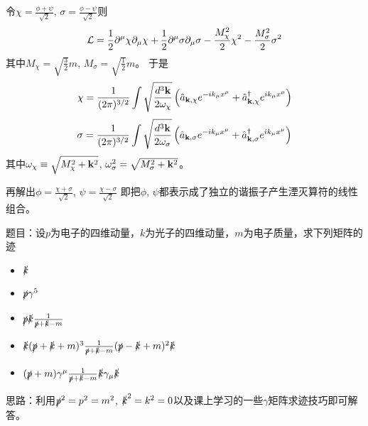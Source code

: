 \documentclass[CJK]{beamer}
\begin{document}
\begin{frame}
\bch
{\small
令$\chi = \frac{\phi+\psi}{\sqrt{2}}$, $\sigma = \frac{\phi-\psi}{\sqrt{2}}$则
$${\mathcal{L}} = \frac{1}{2}\partial^\mu\chi\partial_\mu\chi + \frac{1}{2}\partial^\mu\sigma\partial_\mu\sigma -\frac{M_\chi^2}{2}\chi^2 -\frac{M_\sigma^2}{2}\sigma^2$$
其中$M_\chi = \sqrt{\frac{3}{2}}m$, $M_\sigma = \sqrt{\frac{1}{2}}m$。
于是
$$\chi = \frac{1}{(2\pi)^{3/2}} \int \sqrt{\frac{d^3{\mathbf{k}}}{2\omega_\chi}} \left({\hat{a}}_{{\mathbf{k}},\chi} e^{-ik_\mu x^\mu} + {\hat{a}^\dagger}_{{\mathbf{k}},\chi}e^{ik_\mu x^\mu}\right) $$
$$\sigma = \frac{1}{(2\pi)^{3/2}} \int \sqrt{\frac{d^3{\mathbf{k}}}{2\omega_\sigma}} \left({\hat{a}}_{{\mathbf{k}},\sigma} e^{-ik_\mu x^\mu} + {\hat{a}^\dagger}_{{\mathbf{k}},\sigma}e^{ik_\mu x^\mu}\right) $$
其中$\omega_\chi \equiv \sqrt{M_\chi^2+{\mathbf{k}}^2}$, $\omega_\sigma^2 = \sqrt{M_\sigma^2+{\mathbf{k}}^2}$。

再解出$\phi = \frac{\chi+\sigma}{\sqrt{2}}$, $\psi = \frac{\chi-\sigma}{\sqrt{2}}$ 即把$\phi$, $\psi$都表示成了独立的谐振子产生湮灭算符的线性组合。


}
\ech
\end{frame}


\begin{frame}
\bch
{\small
题目：设$p$为电子的四维动量，$k$为光子的四维动量，$m$为电子质量，求下列矩阵的迹
\begin{itemize}
\item{$\slashed{k}$}
\item{$\slashed{p}\gamma^5$}
\item{$\slashed{p}\slashed{k}\frac{1}{\slashed{p}+\slashed{k}-m}$}
\item{$\slashed{k}(\slashed{p}+\slashed{k}+m)^3\frac{1}{\slashed{p}+\slashed{k}-m}(\slashed{p}-\slashed{k}+m)^2\slashed{k}$}
\item{$(\slashed{p}+m)\gamma^\mu\frac{1}{\slashed{p}+\slashed{k} -m}\slashed{k}\gamma_\mu\slashed{k}$}
\end{itemize}

\skipline

思路：利用$\slashed{p}^2 = p^2 = m^2$, $\slashed{k}^2 = k^2 = 0$以及课上学习的一些$\gamma$矩阵求迹技巧即可解答。
}

\ech
\end{frame}
\end{document}
